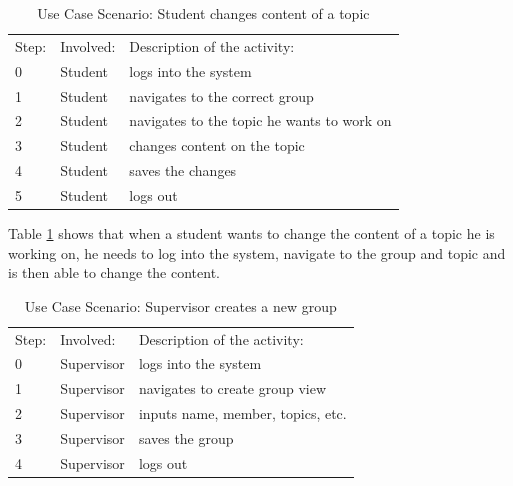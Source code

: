  \begin{table}[h]
\scriptsize
 \caption{Use Case Scenario: Student changes content of a topic}
 \begin{tabular}{lll}
	\toprule
  Step: & Involved: & Description of the activity: \\ 
\cmidrule(rl){1-1}\cmidrule(rl){2-2}\cmidrule(rl){3-3}
  	0 	& Student & logs into the system \\
	1	& Student & navigates to the correct group \\
	2	& Student & navigates to the topic he wants to work on \\
	3	& Student & changes content on the topic \\
	4	& Student & saves the changes \\	
	5	& Student & logs out \\
	\bottomrule
 \end{tabular}
 \label{tab:ucTopicChange}
 \end{table} 

Table \ref{tab:ucTopicChange} shows that when a student wants to change the content of a topic he is working on, he needs to log into the system, navigate to the group and topic and is then able to change the content.
 
 \begin{table}[h]
\scriptsize
 \caption{Use Case Scenario: Supervisor creates a new group}
 \begin{tabular}{lll}
	\toprule
  Step: & Involved: & Description of the activity: \\ 
\cmidrule(rl){1-1}\cmidrule(rl){2-2}\cmidrule(rl){3-3}
  	0 	& Supervisor & logs into the system \\
	1	& Supervisor & navigates to create group view \\
	2	& Supervisor & inputs name, member, topics, etc. \\
	3	& Supervisor & saves the group \\	
	4	& Supervisor & logs out \\
	\bottomrule
 \end{tabular}
 \label{tab:ucGroupCreation}
 \end{table} 

